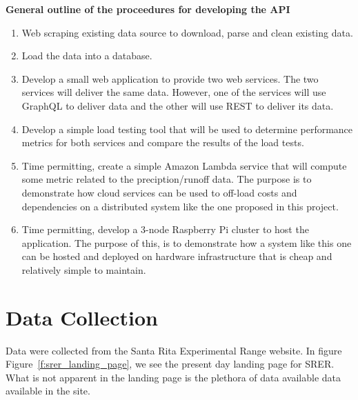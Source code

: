 
\textbf{General outline of the proceedures for developing the API}

\begin{enumerate}
\item Web scraping existing data source to download, parse and clean
  existing data.
\item Load the data into a database.
\item Develop a small web application to provide two web services.
  The two services will deliver the same data.  However, one of the
  services will use GraphQL\cite{hid505FacebookGraphQL2018} to deliver
  data and the other will use REST\cite{hid505swaggerio2018} to
  deliver its data.
\item Develop a simple load testing tool that will be used to
  determine performance metrics for both services and compare the
  results of the load tests.
\item Time permitting, create a simple Amazon Lambda service that will
  compute some metric related to the preciption/runoff data.  The
  purpose is to demonstrate how cloud services can be used to off-load
  costs and dependencies on a distributed system like the one proposed
  in this project.
\item Time permitting, develop a 3-node Raspberry Pi cluster to host
  the application.  The purpose of this, is to demonstrate how a
  system like this one can be hosted and deployed on hardware
  infrastructure that is cheap and relatively simple to maintain.
\end{enumerate}

\section{Data Collection}

Data were collected from the Santa Rita Experimental Range website.  In figure 
Figure~\ref{f:srer_landing_page}, we see the present day landing page for SRER.  
What is not apparent in the landing page is the plethora of data available 
data available in the site.

